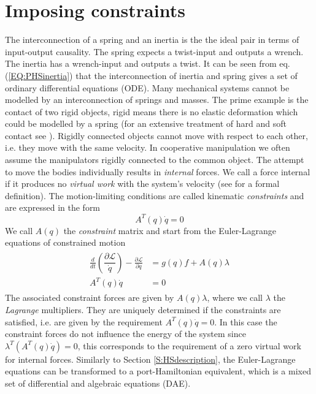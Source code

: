 \documentclass[a4paper,twoside, openright,12pt]{report}
\begin{document}
\section{Imposing constraints}\label{SS:ImposingConstraints}
The interconnection of a spring and an inertia is the the ideal pair in terms of input-output causality. The spring expects a twist-input and outputs a wrench. The inertia has a wrench-input and outputs a twist. It can be seen from eq. (\ref{EQ:PHSinertia}) that the interconnection of inertia and spring gives a set of ordinary differential equations (ODE). Many mechanical systems cannot be modelled by an interconnection of springs and masses. The prime example is the contact of two rigid objects, rigid means there is no elastic deformation which could be modelled by a spring (for an extensive treatment of hard and soft contact see \cite{Duindam_09}). Rigidly connected objects cannot move with respect to each other, i.e. they move with the same velocity. In cooperative manipulation we often assume the manipulators rigidly connected to the common object. The attempt to  move the bodies individually results in \emph{internal} forces. We call a force internal if it produces no \emph{virtual work} with the system's velocity (see \cite{Erhart_16} for a formal definition). The motion-limiting conditions are called kinematic \emph{constraints} and are expressed in the form
\begin{equation}
A^T(q)\dot{q}=0
\end{equation}
We call $A(q)$ the \emph{constraint} matrix and start from the Euler-Lagrange equations of constrained motion \cite{duindam2009geoplexbook}
\begin{eqnarray}
\begin{aligned}
\frac{d}{dt}\left(\dfrac{\partial \mathcal{L}}{\dot{q}}\right) - \frac{\partial \mathcal{L}}{\partial q} &= g(q)f + A(q)\lambda
\\
A^T(q)\dot{q} &= 0
\end{aligned}
\end{eqnarray}
The associated constraint forces are given by $A(q)\lambda$, where we call $\lambda$ the \emph{Lagrange} multipliers. They are uniquely determined if the constraints are satisfied, i.e. are given by the requirement $A^T(q)\dot{q}=0$. In this case the constraint forces do not influence the energy of the system since $\lambda^T (A^T(q)\dot{q}) = 0$, this corresponds to the requirement of a zero virtual work for internal forces. Similarly to Section \ref{S:HSdescription}, the Euler-Lagrange equations can be transformed to a port-Hamiltonian equivalent, which is a mixed set of differential and algebraic equations (DAE).
\end{document}
